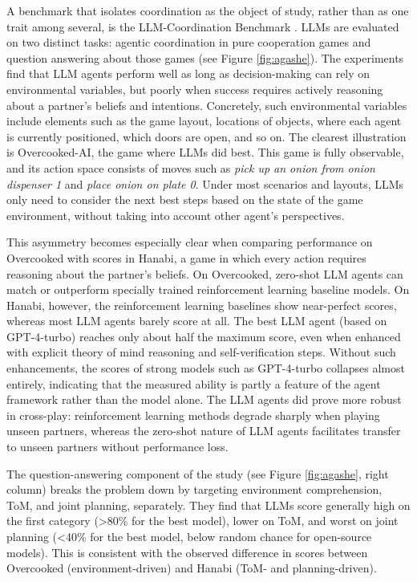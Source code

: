A benchmark that isolates coordination as the object of study, rather than as one trait among several, is the LLM-Coordination Benchmark \citep{agashe2025llm}. LLMs are evaluated on two distinct tasks: agentic coordination in pure cooperation games and question answering about those games (see Figure \ref{fig:agashe}). The experiments find that LLM agents perform well as long as decision-making can rely on environmental variables, but poorly when success requires actively reasoning about a partner's beliefs and intentions. Concretely, such environmental variables include elements such as the game layout, locations of objects, where each agent is currently positioned, which doors are open, and so on. The clearest illustration is Overcooked-AI, the game where LLMs did best. This game is fully observable, and its action space consists of moves such as {\em pick up an onion from onion dispenser 1} and {\em place onion on plate 0}. Under most scenarios and layouts, LLMs only need to consider the next best steps based on the state of the game environment, without taking into account other agent's perspectives.

This asymmetry becomes especially clear when comparing performance on Overcooked with scores in Hanabi, a game in which every action requires reasoning about the partner's beliefs. On Overcooked, zero-shot LLM agents can match or outperform specially trained reinforcement learning baseline models. On Hanabi, however, the reinforcement learning baselines show near-perfect scores, whereas most LLM agents barely score at all. The best LLM agent (based on GPT-4-turbo) reaches only about half the maximum score, even when enhanced with explicit theory of mind reasoning and self-verification steps. Without such enhancements, the scores of strong models such as  GPT-4-turbo collapses almost entirely, indicating that the measured ability is partly a feature of the agent framework rather than the model alone. The LLM agents did prove more robust in cross-play: reinforcement learning methods degrade sharply when playing unseen partners, whereas the zero-shot nature of LLM agents facilitates transfer to unseen partners without performance loss.

The question-answering component of the study (see Figure \ref{fig:agashe}, right column) breaks the problem down by targeting environment comprehension, ToM, and joint planning, separately. They find that LLMs score generally high on the first category (>80\% for the best model), lower on ToM, and worst on joint planning (<40\% for the best model, below random chance for open-source models). This is consistent with the observed difference in scores between Overcooked (environment-driven) and Hanabi (ToM- and planning-driven).

